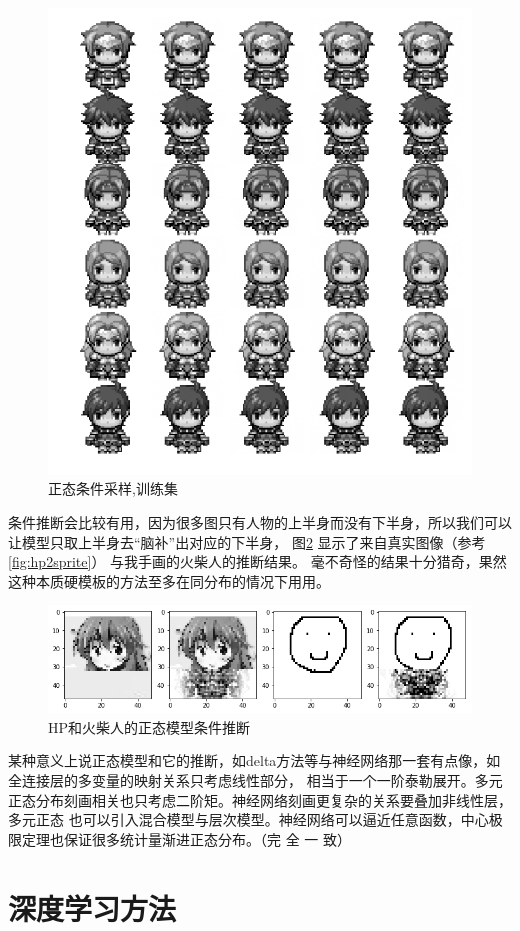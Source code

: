 \documentclass[twocolumn,11pt]{ctexart}
\begin{document}
\begin{figure}[htb]
  \centering
  \includegraphics[width=0.6\linewidth]{normal_conditional_sample2.png}
  \caption{正态条件采样,训练集}
  \label{fig:normcond2}
\end{figure}

条件推断会比较有用，因为很多图只有人物的上半身而没有下半身，所以我们可以让模型只取上半身去“脑补”出对应的下半身，
图\ref{fig:normalreal} 显示了来自真实图像（参考 \ref{fig:hp2sprite}） 与我手画的火柴人的推断结果。
毫不奇怪的结果十分猎奇，果然这种本质硬模板的方法至多在同分布的情况下用用。

\begin{figure}[htb]
  \centering
    \includegraphics[width=\linewidth]{normal_real_test.png}
    \caption{HP和火柴人的正态模型条件推断}
    \label{fig:normalreal}
\end{figure}


某种意义上说正态模型和它的推断，如delta方法等与神经网络那一套有点像，如全连接层的多变量的映射关系只考虑线性部分，
相当于一个一阶泰勒展开。多元正态分布刻画相关也只考虑二阶矩。神经网络刻画更复杂的关系要叠加非线性层，多元正态
也可以引入混合模型与层次模型。神经网络可以逼近任意函数，中心极限定理也保证很多统计量渐进正态分布。（完 全 一 致）

\section{深度学习方法}
\end{document}

